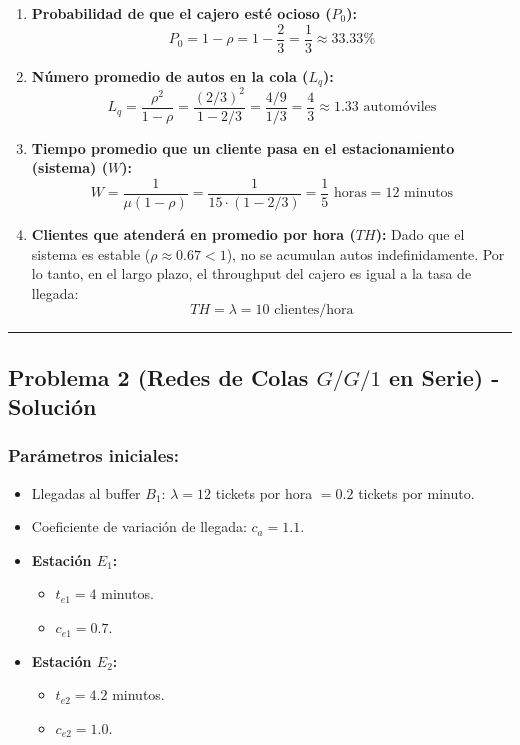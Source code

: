 \documentclass[
]{article}
\providecommand{\tightlist}{%
  \setlength{\itemsep}{0pt}\setlength{\parskip}{0pt}}
\begin{document}
\begin{enumerate}
\def\labelenumi{\arabic{enumi}.}
\item
  \textbf{Probabilidad de que el cajero esté ocioso (\(P_0\)):}
  \[P_0 = 1 - \rho = 1 - \frac{2}{3} = \frac{1}{3} \approx 33.33\%\]
\item
  \textbf{Número promedio de autos en la cola (\(L_q\)):}
  \[L_q = \frac{\rho^2}{1 - \rho} = \frac{(2/3)^2}{1 - 2/3} = \frac{4/9}{1/3} = \frac{4}{3} \approx 1.33 \text{ automóviles}\]
\item
  \textbf{Tiempo promedio que un cliente pasa en el estacionamiento
  (sistema) (\(W\)):}
  \[W = \frac{1}{\mu(1 - \rho)} = \frac{1}{15 \cdot (1 - 2/3)} = \frac{1}{5} \text{ horas} = 12 \text{ minutos}\]
\item
  \textbf{Clientes que atenderá en promedio por hora (\(TH\)):} Dado que
  el sistema es estable (\(\rho \approx 0.67 < 1\)), no se acumulan
  autos indefinidamente. Por lo tanto, en el largo plazo, el throughput
  del cajero es igual a la tasa de llegada:
  \[TH = \lambda = 10 \text{ clientes/hora}\]
\end{enumerate}

\begin{center}\rule{0.5\linewidth}{0.5pt}\end{center}

\hypertarget{problema-2-redes-de-colas-gg1-en-serie---soluciuxf3n}{%
\subsection{\texorpdfstring{Problema 2 (Redes de Colas \(G/G/1\) en
Serie) -
Solución}{Problema 2 (Redes de Colas G/G/1 en Serie) - Solución}}\label{problema-2-redes-de-colas-gg1-en-serie---soluciuxf3n}}

\hypertarget{paruxe1metros-iniciales}{%
\subsubsection{Parámetros iniciales:}\label{paruxe1metros-iniciales}}

\begin{itemize}
\tightlist
\item
  Llegadas al buffer \(B_1\): \(\lambda = 12\) tickets por hora
  \(= 0.2\) tickets por minuto.
\item
  Coeficiente de variación de llegada: \(c_a = 1.1\).
\item
  \textbf{Estación \(E_1\):}

  \begin{itemize}
  \tightlist
  \item
    \(t_{e1} = 4\) minutos.
  \item
    \(c_{e1} = 0.7\).
  \end{itemize}
\item
  \textbf{Estación \(E_2\):}

  \begin{itemize}
  \tightlist
  \item
    \(t_{e2} = 4.2\) minutos.
  \item
    \(c_{e2} = 1.0\).
  \end{itemize}
\end{itemize}
\end{document}
